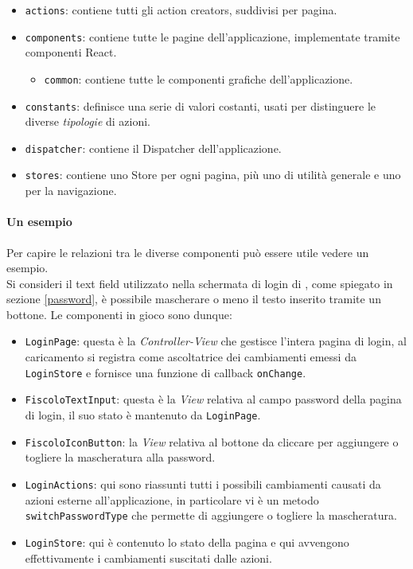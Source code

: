 \begin{itemize}
\item \texttt{actions}: contiene tutti gli action creators, suddivisi per pagina.
\item \texttt{components}: contiene tutte le pagine dell'applicazione, implementate tramite
componenti React.
	\begin{itemize}
	\item \texttt{common}: contiene tutte le componenti grafiche dell'applicazione.
	\end{itemize}
\item \texttt{constants}: definisce una serie di valori costanti, usati per distinguere
le diverse \textit{tipologie} di azioni.
\item \texttt{dispatcher}: contiene il Dispatcher dell'applicazione.
\item \texttt{stores}: contiene uno Store per ogni pagina, più uno di utilità generale e uno
per la navigazione.
\end{itemize}

\paragraph{Un esempio}
Per capire le relazioni tra le diverse componenti può essere utile vedere un esempio. \\

Si consideri il text field utilizzato nella schermata di login di \fiscoloMobile{},
come spiegato in sezione \ref{password}, è possibile mascherare o meno il testo
inserito tramite un bottone.
Le componenti in gioco sono dunque:

\begin{itemize}
\item \texttt{LoginPage}: questa è la \textit{Controller-View} che gestisce l'intera
pagina di login, al caricamento si registra come ascoltatrice dei cambiamenti emessi
da \texttt{LoginStore} e fornisce una funzione di callback \texttt{onChange}.
\item \texttt{FiscoloTextInput}: questa è la \textit{View} relativa al campo password
della pagina di login, il suo stato è mantenuto da \texttt{LoginPage}.
\item \texttt{FiscoloIconButton}: la \textit{View} relativa al bottone da cliccare per
aggiungere o togliere la mascheratura alla password.
\item \texttt{LoginActions}: qui sono riassunti tutti i possibili cambiamenti causati
da azioni esterne all'applicazione, in particolare vi è un metodo \texttt{switchPasswordType}
che permette di aggiungere o togliere la mascheratura.
\item \texttt{LoginStore}: qui è contenuto lo stato della pagina e qui avvengono effettivamente
i cambiamenti suscitati dalle azioni.
\end{itemize}

